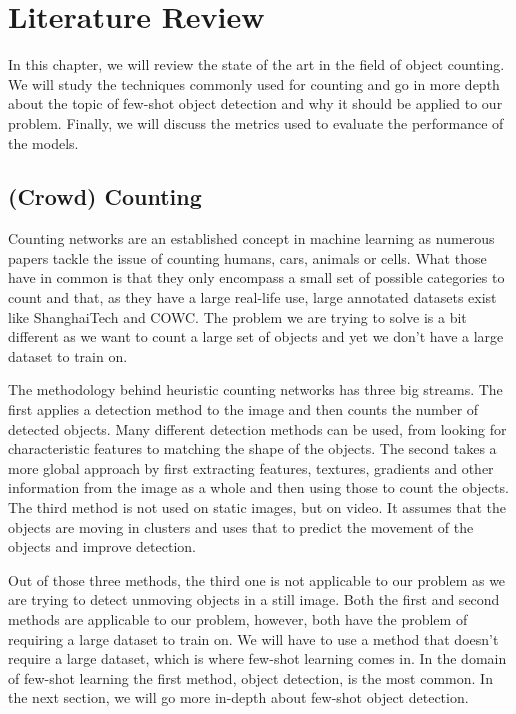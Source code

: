 
\chapter{Literature Review}
In this chapter, we will review the state of the art in the field of object counting. We will study the techniques commonly used for counting and go in more depth about the topic of few-shot object detection and why it should be applied to our problem. Finally, we will discuss the metrics used to evaluate the performance of the models.

\section{(Crowd) Counting}
Counting networks are an established concept in machine learning as numerous papers tackle the issue of counting humans, cars, animals or cells. What those have in common is that they only encompass a small set of possible categories to count and that, as they have a large real-life use, large annotated datasets exist like ShanghaiTech\cite{Shanghaitech} and COWC\cite{COWC}. The problem we are trying to solve is a bit different as we want to count a large set of objects and yet we don't have a large dataset to train on.

The methodology behind heuristic counting networks has three big streams\cite{s22145286}. The first applies a detection method to the image and then counts the number of detected objects. Many different detection methods can be used, from looking for characteristic features to matching the shape of the objects. The second takes a more global approach by first extracting features, textures, gradients and other information from the image as a whole and then using those to count the objects. The third method is not used on static images, but on video. It assumes that the objects are moving in clusters and uses that to predict the movement of the objects and improve detection.

Out of those three methods, the third one is not applicable to our problem as we are trying to detect unmoving objects in a still image.
Both the first and second methods are applicable to our problem, however, both have the problem of requiring a large dataset to train on. We will have to use a method that doesn't require a large dataset, which is where few-shot learning comes in. In the domain of few-shot learning the first method, object detection, is the most common. In the next section, we will go more in-depth about few-shot object detection. %

